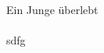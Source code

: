 \documentclass[12pt,a4paper]{scrartcl}
\author{Daniel Koch}
\begin{document}
\Huge Ein Junge überlebt\\
\normalsize
\\
sdfg
\end{document}

